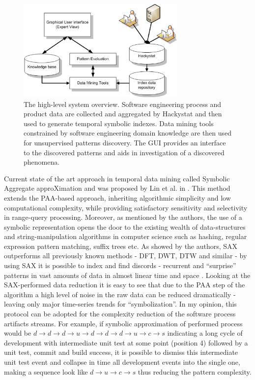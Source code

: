 \documentclass{sig-alternate}
\begin{document}
\begin{figure}[htpb]
   \centering
   \includegraphics[height=50mm]{system_overview.eps}
   \caption{The high-level system overview. Software engineering process and product data are collected and aggregated by Hackystat and then used to generate temporal symbolic indexes. Data mining tools constrained by software engineering domain knowledge are then used for unsupervised patterns discovery. The GUI provides an interface to the discovered patterns and aids in investigation of a discovered phenomena.}
   \label{fig:system_overview}
\end{figure}

Current state of the art approach in temporal data mining called Symbolic Aggregate approXimation and was proposed by Lin et al. in \cite{citeulike:2821475}. This method extends the PAA-based approach, inheriting algorithmic simplicity and low computational complexity, while providing satisfactory sensitivity and selectivity in range-query processing. Moreover, as mentioned by the authors, the use of a symbolic representation opens the door to the existing wealth of data-structures and string-manipulation algorithms in computer science such as hashing, regular expression pattern matching, suffix trees etc. As showed by the authors, SAX outperforms all previously known methods - DFT, DWT, DTW and similar - by using SAX it is possible to index and find discords - recurrent and ``surprise'' patterns in vast amounts of data in almost linear time and space \cite{citeulike:1630245} \cite{citeulike:3025877} \cite{citeulike:3000416}. Looking at the SAX-performed data reduction it is easy to see that due to the PAA step of the algorithm a high level of noise in the raw data can be reduced dramatically - leaving only major time-series trends for ``symbolization''. In my opinion, this protocol can be adopted for the complexity reduction of the software process artifacts streams. For example, if symbolic approximation of performed process would be $d \rightarrow d \rightarrow d \rightarrow u \rightarrow d \rightarrow d \rightarrow d \rightarrow u \rightarrow c \rightarrow s $ indicating a long cycle of development with intermediate unit test at some point (position 4) followed by a unit test, commit and build success, it is possible to dismiss this intermediate unit test event and collapse in time all development events into the single one, making a sequence look like  $d \rightarrow u \rightarrow c \rightarrow s $ thus reducing the pattern complexity. 
\end{document}
